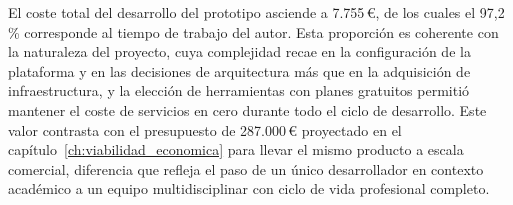 El coste total del desarrollo del prototipo asciende a 7.755\,€, de los cuales el 97,2\,\% corresponde al tiempo de trabajo del autor. Esta proporción es coherente con la naturaleza del proyecto, cuya complejidad recae en la configuración de la plataforma y en las decisiones de arquitectura más que en la adquisición de infraestructura, y la elección de herramientas con planes gratuitos permitió mantener el coste de servicios en cero durante todo el ciclo de desarrollo. Este valor contrasta con el presupuesto de 287.000\,€ proyectado en el capítulo~\ref{ch:viabilidad_economica} para llevar el mismo producto a escala comercial, diferencia que refleja el paso de un único desarrollador en contexto académico a un equipo multidisciplinar con ciclo de vida profesional completo.
